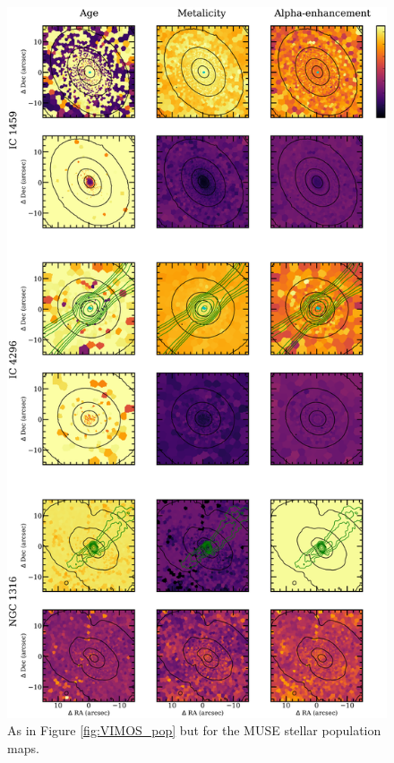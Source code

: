 		\begin{figure}
			\centering
			\includegraphics[height=0.94\textheight]{chapter4/muse/pop1.png}
			\caption[MUSE stellar population maps]{As in Figure \ref{fig:VIMOS_pop} but for the MUSE stellar population maps.}
			\label{fig:MUSE_pop}
		\end{figure}
